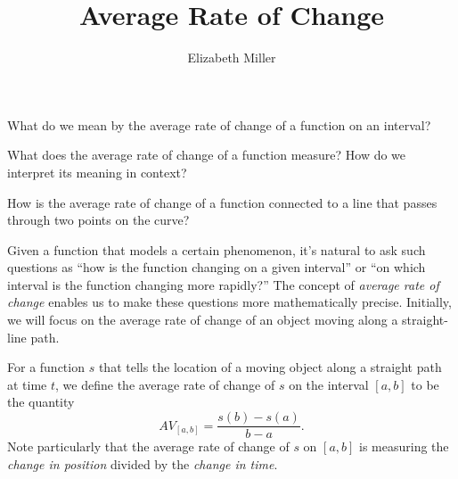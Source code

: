 \documentclass[nooutcomes]{ximera}
\author{Elizabeth Miller}
\title{Average Rate of Change}
\begin{document}
\begin{abstract}
  
\end{abstract}
\maketitle



\begin{motivatingQuestions}
\item What do we mean by the average rate of change of a function on an interval?
\item What does the average rate of change of a function measure?  How do we interpret its meaning in context?
\item How is the average rate of change of a function connected to a line that passes through two points on the curve?
\end{motivatingQuestions}



Given a function that models a certain phenomenon, it's natural to ask such questions as ``how is the function changing on a given interval'' or ``on which interval is the function changing more rapidly?'' The concept of \emph{average rate of change} enables us to make these questions more mathematically precise. Initially, we will focus on the average rate of change of an object moving along a straight-line path.

For a function \(s\) that tells the location of a moving object along a straight path at time \(t\), we define the average rate of change of \(s\) on the interval \([a,b]\) to be the quantity%
\begin{equation*}
AV_{[a,b]} = \frac{s(b)-s(a)}{b-a}\text{.}
\end{equation*}
 Note particularly that the average rate of change of \(s\) on \([a,b]\) is measuring the \emph{change in position} divided by the \emph{change in time}.%
\end{document}
